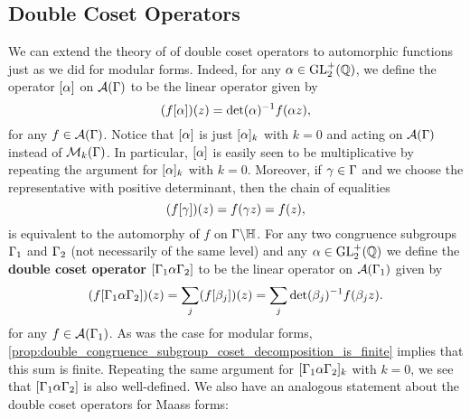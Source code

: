     \subsection*{Double Coset Operators}
      We can extend the theory of of double coset operators to automorphic functions just as we did for modular forms. Indeed, for any $\alpha \in \mathrm{GL}_{2}^{+}(\mathbb{Q})$, we define the operator $[\alpha]$ on $\mathcal{A}(\Gamma)$ to be the linear operator given by
      \[
        (f[\alpha])(z) = \det(\alpha)^{-1}f(\alpha z),
      \]
      for any $f \in \mathcal{A}(\Gamma)$. Notice that $[\alpha]$ is just $[\alpha]_{k}$ with $k = 0$ and acting on $\mathcal{A}(\Gamma)$ instead of $\mathcal{M}_{k}(\Gamma)$. In particular, $[\alpha]$ is easily seen to be multiplicative by repeating the argument for $[\alpha]_{k}$ with $k = 0$. Moreover, if $\gamma \in \Gamma$ and we choose the representative with positive determinant, then the chain of equalities
      \[
        (f[\gamma])(z) = f(\gamma z) = f(z),
      \]
      is equivalent to the automorphy of $f$ on $\Gamma\backslash\mathbb{H}$. For any two congruence subgroups $\Gamma_{1}$ and $\Gamma_{2}$ (not necessarily of the same level) and any $\alpha \in \mathrm{GL}_{2}^{+}(\mathbb{Q})$ we define the \textbf{double coset operator} $[\Gamma_{1}\alpha\Gamma_{2}]$ to be the linear operator on $\mathcal{A}(\Gamma_{1})$ given by
      \[
        (f[\Gamma_{1}\alpha\Gamma_{2}])(z) = \sum_{j}(f[\beta_{j}])(z) = \sum_{j}\det(\beta_{j})^{-1}f(\beta_{j}z).
      \]
      for any $f \in \mathcal{A}(\Gamma_{1})$. As was the case for modular forms, \cref{prop:double_congruence_subgroup_coset_decomposition_is_finite} implies that this sum is finite. Repeating the same argument for $[\Gamma_{1}\alpha\Gamma_{2}]_{k}$ with $k = 0$, we see that $[\Gamma_{1}\alpha\Gamma_{2}]$ is also well-defined.  We also have an analogous statement about the double coset operators for Maass forms:

